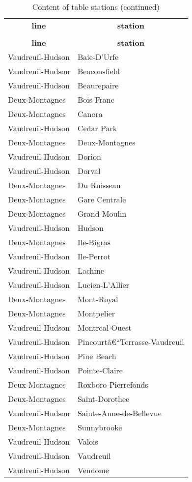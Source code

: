%
%
 \begin{longtable}{|l|l|} 
 \hline \endhead \hline \endfoot \hline 
 \caption{Content of table stations} \label{tab:stations-data} \\\hline \multicolumn{1}{|c|}{\textbf{line}} & \multicolumn{1}{|c|}{\textbf{station}} \\ \hline \hline  \endfirsthead 
\caption{Content of table stations (continued)} \\ \hline \multicolumn{1}{|c|}{\textbf{line}} & \multicolumn{1}{|c|}{\textbf{station}} \\ \hline \hline \endhead \endfoot
Vaudreuil-Hudson & Baie-D'Urfe \\ \hline 
Vaudreuil-Hudson & Beaconsfield \\ \hline 
Vaudreuil-Hudson & Beaurepaire \\ \hline 
Deux-Montagnes & Bois-Franc \\ \hline 
Deux-Montagnes & Canora \\ \hline 
Vaudreuil-Hudson & Cedar Park \\ \hline 
Deux-Montagnes & Deux-Montagnes \\ \hline 
Vaudreuil-Hudson & Dorion \\ \hline 
Vaudreuil-Hudson & Dorval \\ \hline 
Deux-Montagnes & Du Ruisseau \\ \hline 
Deux-Montagnes & Gare Centrale \\ \hline 
Deux-Montagnes & Grand-Moulin \\ \hline 
Vaudreuil-Hudson & Hudson \\ \hline 
Deux-Montagnes & Ile-Bigras \\ \hline 
Vaudreuil-Hudson & Ile-Perrot \\ \hline 
Vaudreuil-Hudson & Lachine \\ \hline 
Vaudreuil-Hudson & Lucien-L'Allier \\ \hline 
Deux-Montagnes & Mont-Royal \\ \hline 
Deux-Montagnes & Montpelier \\ \hline 
Vaudreuil-Hudson & Montreal-Ouest \\ \hline 
Vaudreuil-Hudson & Pincourtâ€“Terrasse-Vaudreuil \\ \hline 
Vaudreuil-Hudson & Pine Beach \\ \hline 
Vaudreuil-Hudson & Pointe-Claire \\ \hline 
Deux-Montagnes & Roxboro-Pierrefonds \\ \hline 
Deux-Montagnes & Saint-Dorothee \\ \hline 
Vaudreuil-Hudson & Sainte-Anne-de-Bellevue \\ \hline 
Deux-Montagnes & Sunnybrooke \\ \hline 
Vaudreuil-Hudson & Valois \\ \hline 
Vaudreuil-Hudson & Vaudreuil \\ \hline 
Vaudreuil-Hudson & Vendome \\ \hline 
 \end{longtable}

